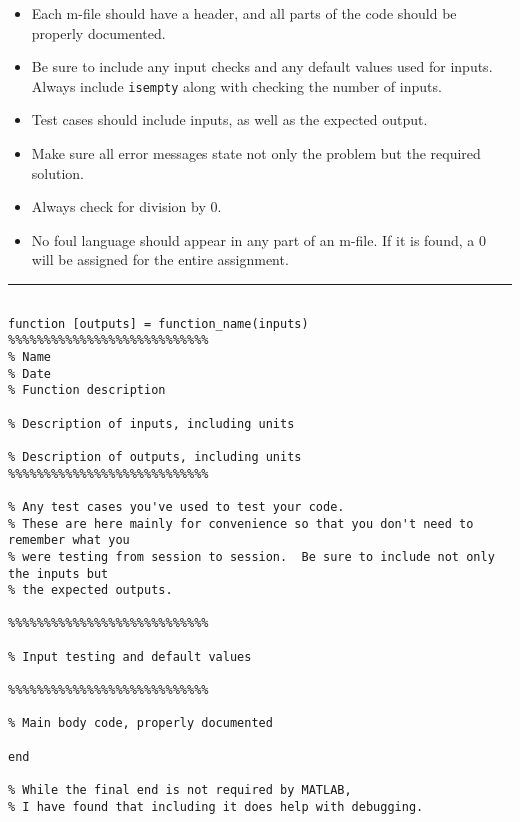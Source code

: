 \documentclass[11pt]{article}
\begin{document}
	\begin{itemize}
	
	\item  Each m-file should have a header, and all parts of the code should be properly documented.
	
	\item  Be sure to include any input checks and any default values used for inputs.  Always include \texttt{isempty} along with checking the number of inputs.
	
	\item  Test cases should include inputs, as well as the expected output.
	
	\item  Make sure all error messages state not only the problem but the required solution.
	
	\item  Always check for division by $0$.
	
	\item  No foul language should appear in any part of an m-file.  If it is found, a $0$ will be assigned for the entire assignment.
	
	\end{itemize}

\medskip\hrule\medskip

\begin{verbatim}

function [outputs] = function_name(inputs)
%%%%%%%%%%%%%%%%%%%%%%%%%%%%
% Name
% Date
% Function description

% Description of inputs, including units

% Description of outputs, including units
%%%%%%%%%%%%%%%%%%%%%%%%%%%%

% Any test cases you've used to test your code.
% These are here mainly for convenience so that you don't need to remember what you
% were testing from session to session.  Be sure to include not only the inputs but
% the expected outputs.

%%%%%%%%%%%%%%%%%%%%%%%%%%%%

% Input testing and default values

%%%%%%%%%%%%%%%%%%%%%%%%%%%%

% Main body code, properly documented

end

% While the final end is not required by MATLAB, 
% I have found that including it does help with debugging.

\end{verbatim}
\end{document}

